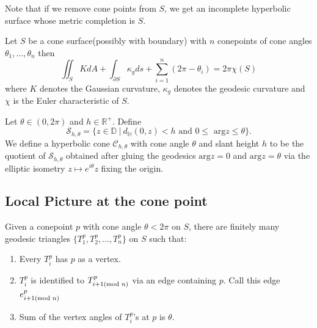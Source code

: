 \noindent Note that if we remove cone points from $S$, we get an incomplete hyperbolic surface whose metric completion is $S$.

\begin{theorem} \label{thm:Gauss-Bonnet}
	Let $S$ be a cone surface(possibly with boundary) with $n$ conepoints of cone angles $\theta_1, \ldots, \theta_n$ then 
	\[\iint_{S} K dA + \int_{\partial S} \kappa_g ds + \sum_{i=1}^{n} \left(2\pi - \theta_i\right) = 2 \pi \chi(S)\]
	where $K$ denotes the Gaussian curvature, $\kappa_g$ denotes the geodesic curvature and $\chi$ is the Euler characteristic of $S$.
\end{theorem}

\begin{defn} \label{HyperbolicCone}
	Let $\theta \in (0, 2 \pi )$ and $h \in \mathbb{R}^{+}$. Define 
			$$\mathcal{S}_{h,\theta} = \{z \in \mathbb{D} ~ | ~ d_{\mathbb{H}}(0,z) < h \text{ and } 0 \leq \text{ arg}z \leq \theta\}.$$
	We define a hyperbolic cone $\mathscr{C}_{h,\theta}$ with cone angle $\theta$ and slant height $h$ to be the quotient of $\mathcal{S}_{h,\theta}$ obtained after gluing the geodesics $\text{arg}z=0$ and $\text{arg}z=\theta$ via the elliptic isometry $z \mapsto e^{i\theta}z$ fixing the origin.
\end{defn}

\subsection*{Local Picture at the cone point}

\noindent Given a conepoint $p$ with cone angle $\theta < 2 \pi$ on $S$, there are finitely many geodesic triangles $\{T_1^p, T_2^p, \ldots, T_n^p\}$ on $S$ such that:
\begin{enumerate}
	\item Every $T_i^p$ has $p$ as a vertex.
	\item $T_i^p$ is identified to $T_{i+1(\textup{mod } n)}^p$ via an edge containing $p$. Call this edge $e_{i+1(\textup{mod }n)}^p$ 
	\item Sum of the vertex angles of $T_i^p$'s at $p$ is $\theta$.
\end{enumerate}

